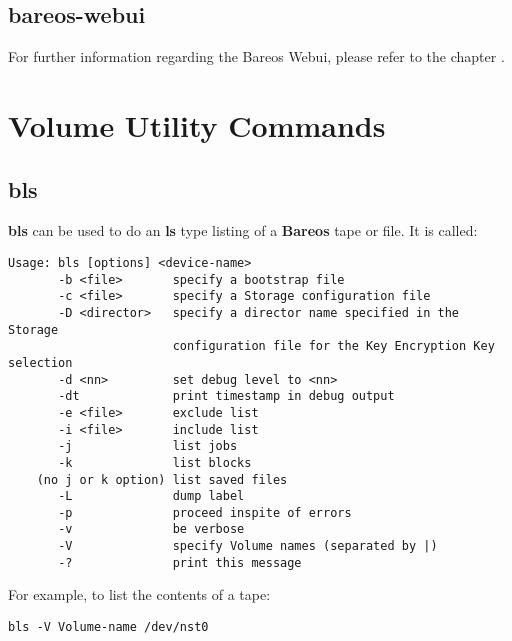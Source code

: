 \subsection{bareos-webui}
\label{bareos-webui}

For further information regarding the Bareos Webui, please refer to the chapter \nameref{}.

\section{Volume Utility Commands}


\subsection{bls}
\label{bls}

{\bf bls} can be used to do an {\bf ls} type listing of a {\bf Bareos} tape or
file. It is called:

\footnotesize
\begin{verbatim}
Usage: bls [options] <device-name>
       -b <file>       specify a bootstrap file
       -c <file>       specify a Storage configuration file
       -D <director>   specify a director name specified in the Storage
                       configuration file for the Key Encryption Key selection
       -d <nn>         set debug level to <nn>
       -dt             print timestamp in debug output
       -e <file>       exclude list
       -i <file>       include list
       -j              list jobs
       -k              list blocks
    (no j or k option) list saved files
       -L              dump label
       -p              proceed inspite of errors
       -v              be verbose
       -V              specify Volume names (separated by |)
       -?              print this message
\end{verbatim}
\normalsize

For example, to list the contents of a tape:

\footnotesize
\begin{verbatim}
bls -V Volume-name /dev/nst0
\end{verbatim}
\normalsize

